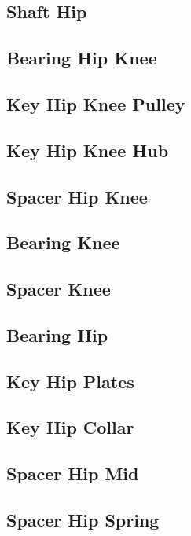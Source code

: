 \subsection{Shaft Hip}

\subsection{Bearing Hip Knee}

\subsection{Key Hip Knee Pulley}

\subsection{Key Hip Knee Hub}

\subsection{Spacer Hip Knee}

\subsection{Bearing Knee}

\subsection{Spacer Knee}

\subsection{Bearing Hip}

\subsection{Key Hip Plates}

\subsection{Key Hip Collar}

\subsection{Spacer Hip Mid}

\subsection{Spacer Hip Spring}

